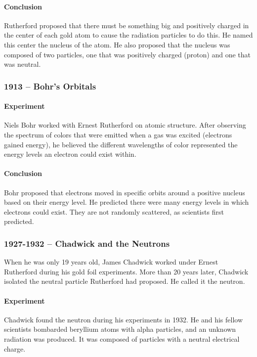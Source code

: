 \paragraph{Conclusion} Rutherford proposed that there must be something big and positively charged in the center of each gold atom to cause the radiation particles to do this. He named this center the nucleus of the atom. He also proposed that the nucleus was composed of two particles, one that was positively charged (proton) and one that was neutral.

\subsubsection*{1913 -- Bohr's Orbitals}

\paragraph{Experiment} Niels Bohr worked with Ernest Rutherford on atomic structure. After observing the spectrum of colors that were emitted when a gas was excited (electrons gained energy), he believed the different wavelengths of color represented the energy levels an electron could exist within.

\paragraph{Conclusion} Bohr proposed that electrons moved in specific orbits around a positive nucleus based on their energy level. He predicted there were many energy levels in which electrons could exist. They are not randomly scattered, as scientists first predicted.

\subsubsection*{1927-1932 -- Chadwick and the Neutrons}

When he was only 19 years old, James Chadwick worked under Ernest Rutherford during his gold foil experiments. More than 20 years later, Chadwick isolated the neutral particle Rutherford had proposed. He called it the neutron.

\paragraph{Experiment} Chadwick found the neutron during his experiments in 1932. He and his fellow scientists bombarded beryllium atoms with alpha particles, and an unknown radiation was produced. It was composed of particles with a neutral electrical charge.

